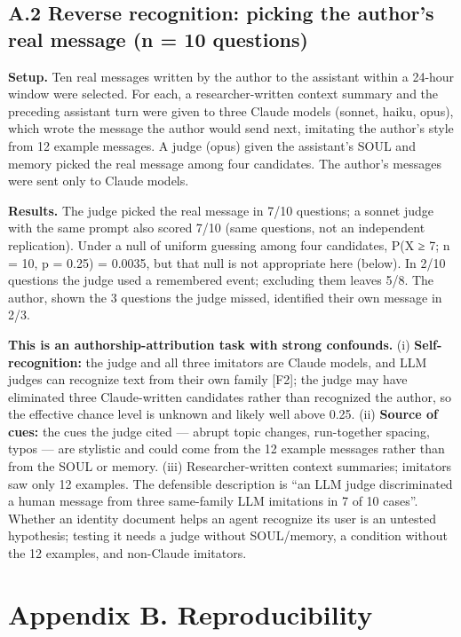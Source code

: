 \documentclass[10pt]{article}
\begin{document}
\subsection{A.2 Reverse recognition: picking the author's real message (n = 10 questions)}\label{a.2-reverse-recognition-picking-the-authors-real-message-n-10-questions}

\textbf{Setup.} Ten real messages written by the author to the assistant within a 24-hour window were selected. For each, a researcher-written context summary and the preceding assistant turn were given to three Claude models (sonnet, haiku, opus), which wrote the message the author would send next, imitating the author's style from 12 example messages. A judge (opus) given the assistant's SOUL and memory picked the real message among four candidates. The author's messages were sent only to Claude models.

\textbf{Results.} The judge picked the real message in 7/10 questions; a sonnet judge with the same prompt also scored 7/10 (same questions, not an independent replication). Under a null of uniform guessing among four candidates, P(X ≥ 7; n = 10, p = 0.25) = 0.0035, but that null is not appropriate here (below). In 2/10 questions the judge used a remembered event; excluding them leaves 5/8. The author, shown the 3 questions the judge missed, identified their own message in 2/3.

\textbf{This is an authorship-attribution task with strong confounds.} (i) \textbf{Self-recognition:} the judge and all three imitators are Claude models, and LLM judges can recognize text from their own family {[}F2{]}; the judge may have eliminated three Claude-written candidates rather than recognized the author, so the effective chance level is unknown and likely well above 0.25. (ii) \textbf{Source of cues:} the cues the judge cited --- abrupt topic changes, run-together spacing, typos --- are stylistic and could come from the 12 example messages rather than from the SOUL or memory. (iii) Researcher-written context summaries; imitators saw only 12 examples. The defensible description is ``an LLM judge discriminated a human message from three same-family LLM imitations in 7 of 10 cases''. Whether an identity document helps an agent recognize its user is an untested hypothesis; testing it needs a judge without SOUL/memory, a condition without the 12 examples, and non-Claude imitators.

\section{Appendix B. Reproducibility}\label{appendix-b.-reproducibility}
\end{document}
